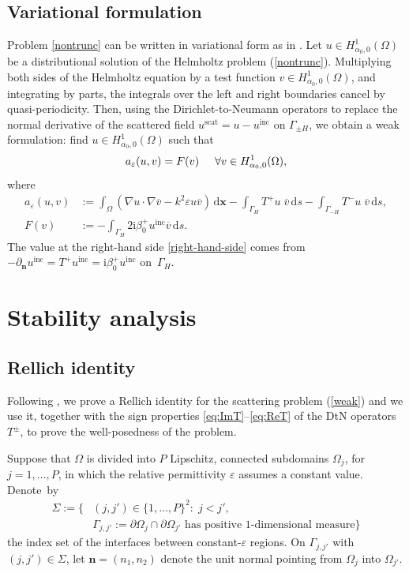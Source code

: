 \documentclass[a4paper,10pt]{article}
\newcommand{\bx}{{\mathbf x}}
\newcommand{\bn}{{\mathbf n}}
\newcommand{\ri}{{\mathrm i}}
\newcommand{\rd}{{\,\mathrm d}}
\newcommand{\inc}{{\mathrm{inc}}}
\newcommand{\scat}{{\mathrm{scat}}}
\newcommand{\dn}{{\partial_\bn}}
\newcommand{\cv}{{\overline{v}}}
\newcommand{\GH}{{\Gamma_H}}
\newcommand{\GmH}{{\Gamma_{-H}}}
\newcommand{\GpmH}{{\Gamma_{\pm H}}}
\begin{document}
\subsection{Variational formulation} 
Problem \eqref{nontrunc} can be written in variational form as in \cite[\S3.3]{BonnetBD1994}.
Let $u \in H^1_{\alpha_0, 0}(\Omega)$ be a distributional solution of the Helmholtz problem (\ref{nontrunc}). 
Multiplying both sides of the Helmholtz equation by a test function $v\in H^1_{\alpha_0, 0}(\Omega)$, and integrating by parts, the integrals over the left and right boundaries cancel by quasi-periodicity. Then, using the Dirichlet-to-Neumann operators to replace the normal derivative of the scattered field
$u^\scat=u-u^\inc$ on $\GpmH$, we obtain a weak formulation: find $u \in H^1_{\alpha_0, 0}(\Omega)$ such that
\begin{equation} \label{weak}
a_\varepsilon(u,v) = F(v) \hspace{0.5cm} \forall  v \in H^1_{\alpha_0, 0}(\Omega),
\end{equation}
where
\begin{align} \label{bilinear}
a_\varepsilon(u,v) & := 
\int_\Omega \left( \nabla u \cdot \nabla \cv - k^2\varepsilon u\cv \right) \rd\bx 
- \int_\GH  T^+u \; \cv \rd s 
- \int_\GmH T^-u \; \cv  \rd s, \\ \label{right-hand-side}
F(v) &  := -\int_\GH 2\ri\beta_0^+ u^\inc  \cv \rd s.
\end{align}
The value at the right-hand side \eqref{right-hand-side} comes from 
$-\dn u^\inc = T^+ u^\inc=\ri\beta_0^+ u^\inc$ on~$\GH$.


\section{Stability analysis} 
\label{s:Stability}
\subsection{Rellich identity}
\label{s:Uniqueness}

Following \cite{Civiletti2020, Lechleiter2010}, we prove a Rellich identity for the scattering problem (\ref{weak}) and 
we use it, together with the sign properties \eqref{eq:ImT}--\eqref{eq:ReT} of the DtN operators $T^\pm$,
to prove the well-posedness of the problem.

Suppose that $\Omega$ is divided into $P$ %
Lipschitz, connected subdomains $\Omega_j$, for $j=1,\ldots,P$, in which the relative permittivity $\varepsilon$ assumes a constant value.
Denote~by 
\begin{align*}
\Sigma:=\big\{&(j,j')\in \{1,\ldots,P\}^2: \; j<j',\\
&\Gamma_{j,j'}:=\partial\Omega_j\cap\partial\Omega_{j'} \text{ has positive 1-dimensional measure}\big\} 
\end{align*}
the index set of the interfaces between constant-$\varepsilon$ regions.
On $\Gamma_{j,j'}$ with $(j,j')\in\Sigma$, let $\bn=(n_1,n_2)$ denote the unit normal pointing from $\Omega_j$ into $\Omega_{j'}$.
\end{document}
